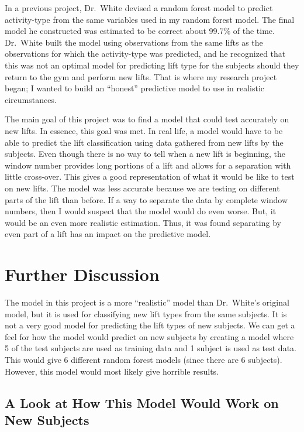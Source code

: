 \documentclass[12pt,twoside]{reedthesis}
\begin{document}
  In a previous project, Dr.~White devised a random forest model to
  predict activity-type from the same variables used in my random forest
  model. The final model he constructed was estimated to be correct about
  99.7\% of the time. Dr.~White built the model using observations from
  the same lifts as the observations for which the activity-type was
  predicted, and he recognized that this was not an optimal model for
  predicting lift type for the subjects should they return to the gym and
  perform new lifts. That is where my research project began; I wanted to
  build an ``honest'' predictive model to use in realistic circumstances.
  
  The main goal of this project was to find a model that could test
  accurately on new lifts. In essence, this goal was met. In real life, a
  model would have to be able to predict the lift classification using
  data gathered from new lifts by the subjects. Even though there is no
  way to tell when a new lift is beginning, the window number provides
  long portions of a lift and allows for a separation with little
  cross-over. This gives a good representation of what it would be like to
  test on new lifts. The model was less accurate because we are testing on
  different parts of the lift than before. If a way to separate the data
  by complete window numbers, then I would suspect that the model would do
  even worse. But, it would be an even more realistic estimation. Thus, it
  was found separating by even part of a lift has an impact on the
  predictive model.
  
  \section{Further Discussion}\label{further-discussion}
  
  The model in this project is a more ``realistic'' model than Dr.~White's
  original model, but it is used for classifying new lift types from the
  same subjects. It is not a very good model for predicting the lift types
  of new subjects. We can get a feel for how the model would predict on
  new subjects by creating a model where 5 of the test subjects are used
  as training data and 1 subject is used as test data. This would give 6
  different random forest models (since there are 6 subjects). However,
  this model would most likely give horrible results.
  
  \subsection{A Look at How This Model Would Work on New
  Subjects}\label{a-look-at-how-this-model-would-work-on-new-subjects}
  
\end{document}
